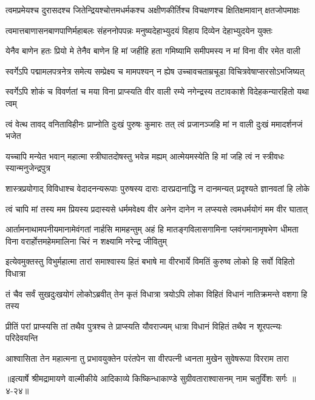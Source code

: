 \twolineshloka
{त्वमप्रमेयश्च दुरासदश्च जितेन्द्रियश्चोत्तमधर्मकश्च}
{अक्षीणकीर्तिश्च विचक्षणश्च क्षितिक्षमावान् क्षतजोपमाक्षः} %

\twolineshloka
{त्वमात्तबाणासनबाणपाणिर्महाबलः संहननोपपन्नः}
{मनुष्यदेहाभ्युदयं विहाय दिव्येन देहाभ्युदयेन युक्तः} %

\twolineshloka
{येनैव बाणेन हतः प्रियो मे तेनैव बाणेन हि मां जहीहि}
{हता गमिष्यामि समीपमस्य न मां विना वीर रमेत वाली} %

\twolineshloka
{स्वर्गेऽपि पद्मामलपत्रनेत्र समेत्य सम्प्रेक्ष्य च मामपश्यन्}
{न ह्येष उच्चावचताम्रचूडा विचित्रवेषाप्सरसोऽभजिष्यत्} %

\twolineshloka
{स्वर्गेऽपि शोकं च विवर्णतां च मया विना प्राप्स्यति वीर वाली}
{रम्ये नगेन्द्रस्य तटावकाशे विदेहकन्यारहितो यथा त्वम्} %

\twolineshloka
{त्वं वेत्थ तावद् वनिताविहीनः प्राप्नोति दुःखं पुरुषः कुमारः}
{तत् त्वं प्रजानञ्जहि मां न वाली दुःखं ममादर्शनजं भजेत} %

\twolineshloka
{यच्चापि मन्येत भवान् महात्मा स्त्रीघातदोषस्तु भवेन्न मह्यम्}
{आत्मेयमस्येति हि मां जहि त्वं न स्त्रीवधः स्यान्मनुजेन्द्रपुत्र} %

\twolineshloka
{शास्त्रप्रयोगाद् विविधाश्च वेदादनन्यरूपाः पुरुषस्य दाराः}
{दारप्रदानाद्धि न दानमन्यत् प्रदृश्यते ज्ञानवतां हि लोके} %

\twolineshloka
{त्वं चापि मां तस्य मम प्रियस्य प्रदास्यसे धर्ममवेक्ष्य वीर}
{अनेन दानेन न लप्स्यसे त्वमधर्मयोगं मम वीर घातात्} %

\threelineshloka
{आर्तामनाथामपनीयमानामेवंगतां नार्हसि मामहन्तुम्}
{अहं हि मातङ्गविलासगामिना प्लवंगमानामृषभेण धीमता}
{विना वरार्होत्तमहेममालिना चिरं न शक्ष्यामि नरेन्द्र जीवितुम्} %

\twolineshloka
{इत्येवमुक्तस्तु विभुर्महात्मा तारां समाश्वास्य हितं बभाषे}
{मा वीरभार्ये विमतिं कुरुष्व लोको हि सर्वो विहितो विधात्रा} %

\twolineshloka
{तं चैव सर्वं सुखदुःखयोगं लोकोऽब्रवीत् तेन कृतं विधात्रा}
{त्रयोऽपि लोका विहितं विधानं नातिक्रमन्ते वशगा हि तस्य} %

\twolineshloka
{प्रीतिं परां प्राप्स्यसि तां तथैव पुत्रश्च ते प्राप्स्यति यौवराज्यम्}
{धात्रा विधानं विहितं तथैव न शूरपत्न्यः परिदेवयन्ति} %

\twolineshloka
{आश्वासिता तेन महात्मना तु प्रभावयुक्तेन परंतपेन}
{सा वीरपत्नी ध्वनता मुखेन सुवेषरूपा विरराम तारा} %


॥इत्यार्षे श्रीमद्रामायणे वाल्मीकीये आदिकाव्ये किष्किन्धाकाण्डे सुग्रीवताराश्वासनम् नाम चतुर्विंशः सर्गः ॥४-२४॥
